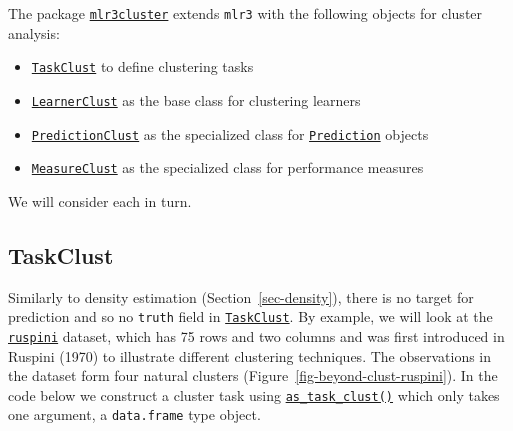 The package
\href{https://mlr3cluster.mlr-org.com}{\texttt{mlr3cluster}}
extends \texttt{mlr3} with the following objects for cluster analysis:

\begin{itemize}
\tightlist
\item
  \href{https://mlr3cluster.mlr-org.com/reference/TaskClust.html}{\texttt{TaskClust}}
  to define clustering tasks
\item
  \href{https://mlr3cluster.mlr-org.com/reference/LearnerClust.html}{\texttt{LearnerClust}}
  as the base class for clustering learners
\item
  \href{https://mlr3cluster.mlr-org.com/reference/PredictionClust.html}{\texttt{PredictionClust}}
  as the specialized class for
  \href{https://mlr3.mlr-org.com/reference/Prediction.html}{\texttt{Prediction}}
  objects
\item
  \href{https://mlr3cluster.mlr-org.com/reference/MeasureClust.html}{\texttt{MeasureClust}}
  as the specialized class for performance measures
\end{itemize}

We will consider each in turn.

\hypertarget{taskclust}{%
\subsection{TaskClust}\label{taskclust}}

Similarly to density estimation (Section~\ref{sec-density}), there is no
target for prediction and so no \texttt{truth} field in
\href{https://mlr3cluster.mlr-org.com/reference/TaskClust.html}{\texttt{TaskClust}}.
By example, we will look at the
\href{https://www.rdocumentation.org/packages/cluster/topics/ruspini}{\texttt{ruspini}}
dataset, which has 75 rows and two columns and was first introduced in
Ruspini (1970) to illustrate different clustering techniques. The
observations in the dataset form four natural clusters
(Figure~\ref{fig-beyond-clust-ruspini}). In the code below we construct
a cluster task using
\href{https://mlr3cluster.mlr-org.com/reference/as_task_clust.html}{\texttt{as\_task\_clust()}}
which only takes one argument, a \texttt{data.frame} type object.

\begin{Shaded}
\begin{Highlighting}[]
\OtherTok{=} 
\end{Highlighting}
\end{Shaded}

